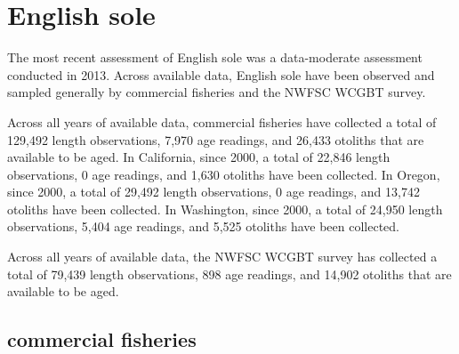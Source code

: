 \documentclass[11pt,
  english,
  letterpaper,
]{article}
\begin{document}
\leavevmode\tagmcend\tagstructend\par
\endgroup{}
\endgroup{}


\hypertarget{english-sole}{%
\section{English sole}\label{english-sole}}

\leavevmode\tagmcend\tagstructend


The most recent assessment of English sole was a data-moderate assessment conducted in 2013. Across available data, English sole have been observed and sampled generally by commercial fisheries and the NWFSC WCGBT survey.

\leavevmode\tagmcend\tagstructend\par


Across all years of available data, commercial fisheries have collected a total of 129,492 length observations, 7,970 age readings, and 26,433 otoliths that are available to be aged. In California, since 2000, a total of 22,846 length observations, 0 age readings, and 1,630 otoliths have been collected. In Oregon, since 2000, a total of 29,492 length observations, 0 age readings, and 13,742 otoliths have been collected. In Washington, since 2000, a total of 24,950 length observations, 5,404 age readings, and 5,525 otoliths have been collected.

\leavevmode\tagmcend\tagstructend\par


Across all years of available data, the NWFSC WCGBT survey has collected a total of 79,439 length observations, 898 age readings, and 14,902 otoliths that are available to be aged.

\leavevmode\tagmcend\tagstructend\par


\hypertarget{commercial-fisheries-19}{%
\subsection{commercial fisheries}\label{commercial-fisheries-19}}
\end{document}
